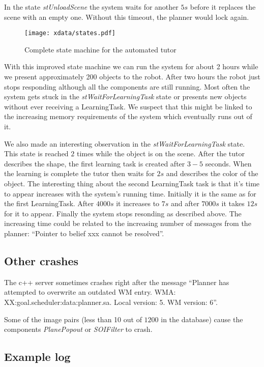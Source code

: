 \documentclass{article}
\begin{document}
In the state {\em stUnloadScene} the system waits for another $5s$ before it
replaces the scene with an empty one. Without this timeout, the planner would
lock again.

\begin{figure}
\texttt{[image: xdata/states.pdf]}
\label{fig:allStates}
\caption{Complete state machine for the automated tutor}
\end{figure}

With this improved state machine we can run the system for about 2 hours while
we present approximately 200 objects to the robot. After two hours the robot
just stops responding although all the components are still running. Most often
the system gets stuck in the {\em stWaitForLearningTask} state or presents new
objects without ever receiving a LearningTask.  We suspect that this might be
linked to the increasing memory requirements of the system which eventually
runs out of it.

We also made an interesting observation in the {\em stWaitForLearningTask}
state. This state is reached $2$ times while the object is on the scene. After
the tutor describes the shape, the first learning task is created after $3-5$
seconds. When the learning is complete the tutor then waits for $2s$ and
describes the color of the object.  The interesting thing about the second
LearningTask task is that it's time to appear increases with the system's
running time. Initially it is the same as for the first LearningTask. After
$4000s$ it increases to $7s$ and after $7000s$ it takes $12s$ for it to appear.
Finally the system stops resonding as described above.  The increasing time
could be related to the increasing number of messages from the planner:
``Pointer to belief xxx cannot be resolved''.

\subsection{Other crashes}

The c++ server sometimes crashes right after the message ``Planner has
attempted to overwrite an outdated WM entry. WMA:
XX:goal.scheduler:data:planner.sa.  Local version: 5.  WM version: 6''.

Some of the image pairs (less than 10 out of $1200$ in the database) cause the
components {\em PlanePopout} or {\em SOIFilter} to crash.

\subsection{Example log}
\end{document}
